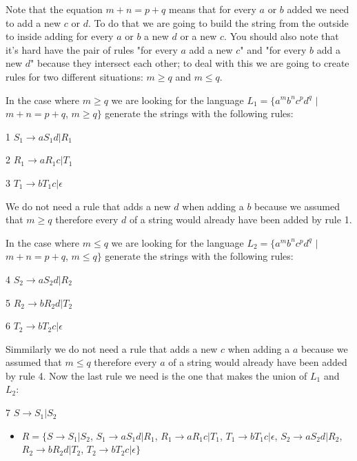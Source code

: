\documentclass[11pt]{article}
\begin{document}
\par Note that the equation $m + n = p + q$ means that for every $a$ or $b$ added we need to add a new $c$ or $d$. To do that we are going to build the string from the outside to inside adding for every $a$ or $b$ a new $d$ or a new $c$. You should also note that it's hard have the pair of rules "for every $a$ add a new $c$" and "for every $b$ add a new $d$" because they intersect each other; to deal with this we are going to create rules for two different situations: $m \geq q$ and $m \leq q$.
\par In the case where $m \geq q$ we are looking for the language $L_1 = \{a^mb^nc^pd^q$ $|$ $m + n = p + q$, $m \geq q\} $ generate the strings with the following rules:
\par 1 $S_1 \rightarrow aS_1d | R_1$
\par 2 $R_1 \rightarrow aR_1c | T_1$
\par 3 $T_1 \rightarrow bT_1c | \epsilon$
\par We do not need a rule that adds a new $d$ when adding a $b$ because we assumed that $m \geq q$ therefore every $d$ of a string would already have been added by rule 1.
\par In the case where $m \leq q$ we are looking for the language $L_2 = \{a^mb^nc^pd^q$ $|$ $m + n = p + q$, $m \leq q\} $ generate the strings with the following rules:
\par 4 $S_2 \rightarrow aS_2d | R_2$
\par 5 $R_2 \rightarrow bR_2d | T_2$
\par 6 $T_2 \rightarrow bT_2c | \epsilon$
\par Simmilarly we do not need a rule that adds a new $c$ when adding a $a$ because we assumed that $m \leq q$ therefore every $a$ of a string would already have been added by rule 4.
    Now the last rule we need is the one that makes the union of $L_1$ and $L_2$: 
\par 7 $S \rightarrow S_1 | S_2$

\begin{itemize}    
    \item{$R = \{S \rightarrow S_1 | S_2$, 
        $S_1 \rightarrow aS_1d | R_1$,
        $R_1 \rightarrow aR_1c | T_1$,
        $T_1 \rightarrow bT_1c | \epsilon$,
        $S_2 \rightarrow aS_2d | R_2$,
        $R_2 \rightarrow bR_2d | T_2$,
        $T_2 \rightarrow bT_2c | \epsilon\}$
      }
\end{itemize}
\end{document}
